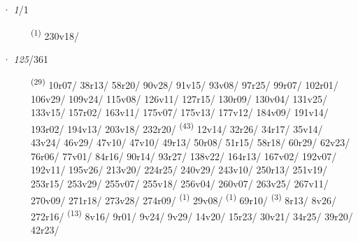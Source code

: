 \ENTRYEND
\noindent{} · \textit{1}/1 \LEMMALINE
\begin{description}
    \item[]  \textsuperscript{(1)} \mbox{230v18/}
\end{description}
\ENTRYEND
\noindent{} · \textit{125}/361 \LEMMALINE
\begin{description}
    \item[]  \textsuperscript{(29)} \mbox{10r07/} \mbox{38r13/} \mbox{58r20/} \mbox{90v28/} \mbox{91v15/} \mbox{93v08/} \mbox{97r25/} \mbox{99r07/} \mbox{102r01/} \mbox{106v29/} \mbox{109v24/} \mbox{115v08/} \mbox{126v11/} \mbox{127r15/} \mbox{130r09/} \mbox{130v04/} \mbox{131v25/} \mbox{133v15/} \mbox{157r02/} \mbox{163v11/} \mbox{175v07/} \mbox{175v13/} \mbox{177v12/} \mbox{184v09/} \mbox{191v14/} \mbox{193r02/} \mbox{194v13/} \mbox{203v18/} \mbox{232r20/} \textsuperscript{(43)} \mbox{12v14/} \mbox{32r26/} \mbox{34r17/} \mbox{35v14/} \mbox{43v24/} \mbox{46v29/} \mbox{47v10/} \mbox{47v10/} \mbox{49r13/} \mbox{50r08/} \mbox{51r15/} \mbox{58r18/} \mbox{60r29/} \mbox{62v23/} \mbox{76r06/} \mbox{77v01/} \mbox{84r16/} \mbox{90r14/} \mbox{93r27/} \mbox{138v22/} \mbox{164r13/} \mbox{167v02/} \mbox{192v07/} \mbox{192v11/} \mbox{195v26/} \mbox{213v20/} \mbox{224r25/} \mbox{240v29/} \mbox{243v10/} \mbox{250r13/} \mbox{251v19/} \mbox{253r15/} \mbox{253v29/} \mbox{255v07/} \mbox{255v18/} \mbox{256v04/} \mbox{260v07/} \mbox{263v25/} \mbox{267v11/} \mbox{270v09/} \mbox{271r18/} \mbox{273v28/} \mbox{274r09/} \textsuperscript{(1)} \mbox{29v08/} \textsuperscript{(1)} \mbox{69r10/} \CASEBREAK {} \textsuperscript{(3)} \mbox{8r13/} \mbox{8v26/} \mbox{272r16/} \textsuperscript{(13)} \mbox{8v16/} \mbox{9r01/} \mbox{9v24/} \mbox{9v29/} \mbox{14v20/} \mbox{15r23/} \mbox{30v21/} \mbox{34r25/} \mbox{39r20/} \mbox{42r23/} 
\end{description}
